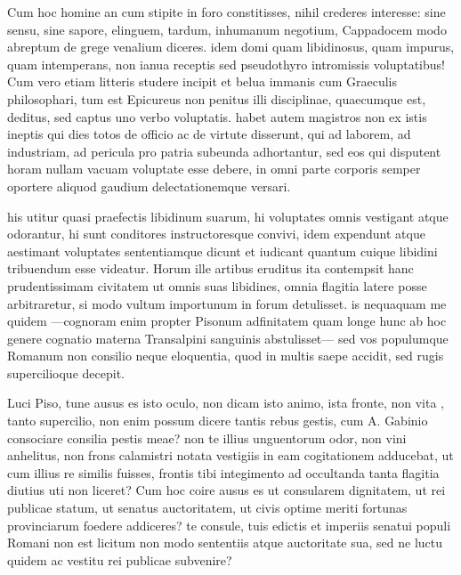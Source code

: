  Cum hoc homine an cum stipite in foro constitisses, nihil crederes interesse: sine sensu, sine sapore, elinguem, tardum, inhumanum negotium, Cappadocem modo abreptum de grege venalium diceres. idem domi quam libidinosus, quam impurus, quam intemperans, non ianua receptis sed pseudothyro intromissis voluptatibus! Cum vero etiam litteris studere incipit et belua immanis cum Graeculis philosophari, tum est Epicureus non penitus illi disciplinae, quaecumque est, deditus, sed captus uno verbo voluptatis. habet autem magistros non ex istis ineptis qui dies totos de officio ac de virtute disserunt, qui ad laborem, ad industriam, ad pericula pro patria subeunda adhortantur, sed eos qui disputent horam nullam vacuam voluptate esse debere, in omni parte corporis semper oportere aliquod gaudium delectationemque versari.

 his utitur quasi praefectis libidinum suarum, hi voluptates omnis vestigant atque odorantur, hi sunt conditores instructoresque convivi, idem expendunt atque aestimant voluptates sententiamque dicunt et iudicant quantum cuique libidini tribuendum esse videatur. Horum ille artibus eruditus ita contempsit hanc prudentissimam civitatem ut omnis suas libidines, omnia flagitia latere posse arbitraretur, si modo vultum importunum in forum detulisset. is nequaquam me quidem —cognoram enim propter Pisonum adfinitatem quam longe hunc ab hoc genere cognatio materna Transalpini sanguinis abstulisset— sed vos populumque Romanum non consilio neque eloquentia, quod in multis saepe accidit, sed rugis supercilioque decepit.

 Luci Piso, tune ausus es isto oculo, non dicam isto animo, ista fronte, non vita , tanto supercilio, non enim possum dicere tantis rebus gestis, cum A. Gabinio consociare consilia pestis meae? non te illius unguentorum odor, non vini anhelitus, non frons calamistri notata vestigiis in eam cogitationem adducebat, ut cum illius re similis fuisses, frontis tibi integimento ad occultanda tanta flagitia diutius uti non liceret? Cum hoc coire ausus es ut consularem dignitatem, ut rei publicae statum, ut senatus auctoritatem, ut civis optime meriti fortunas provinciarum foedere addiceres? te consule, tuis edictis et imperiis senatui populi Romani non est licitum non modo sententiis atque auctoritate sua, sed ne luctu quidem ac vestitu rei publicae subvenire?

